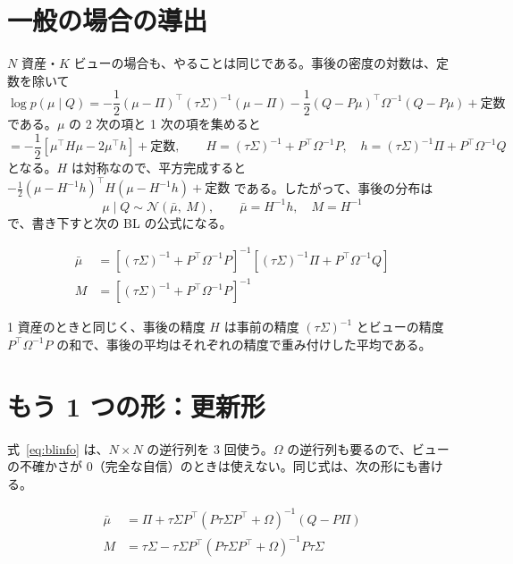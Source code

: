 \documentclass[xelatex,ja=standard,jafont=hiragino-pron,a4paper,11pt,openany]{bxjsreport}
\newcommand{\T}{^{\top}}
\newcommand{\mub}{\bar{\mu}}
\begin{document}
\section{一般の場合の導出}

$N$ 資産・$K$ ビューの場合も、やることは同じである。事後の密度の対数は、定数を除いて
\[
\log p(\mu \mid Q) = -\frac{1}{2}(\mu - \Pi)\T(\tau\Sigma)^{-1}(\mu - \Pi) - \frac{1}{2}(Q - P\mu)\T\Omega^{-1}(Q - P\mu) + \text{定数}
\]
である。$\mu$ の 2 次の項と 1 次の項を集めると
\[
= -\frac{1}{2}\left[\mu\T H\mu - 2\mu\T h\right] + \text{定数},\qquad
H = (\tau\Sigma)^{-1} + P\T\Omega^{-1}P,\quad
h = (\tau\Sigma)^{-1}\Pi + P\T\Omega^{-1}Q
\]
となる。$H$ は対称なので、平方完成すると $-\frac{1}{2}(\mu - H^{-1}h)\T H(\mu - H^{-1}h) + \text{定数}$ である。したがって、事後の分布は
\begin{equation}
\mu \mid Q \sim \mathcal{N}(\mub,\ M),\qquad
\mub = H^{-1}h,\quad M = H^{-1}
\end{equation}
で、書き下すと次の BL の公式になる。

\begin{thmbox}
\begin{align}
\mub &= \left[(\tau\Sigma)^{-1} + P\T\Omega^{-1}P\right]^{-1}\left[(\tau\Sigma)^{-1}\Pi + P\T\Omega^{-1}Q\right] \label{eq:blinfo}\\
M &= \left[(\tau\Sigma)^{-1} + P\T\Omega^{-1}P\right]^{-1} \label{eq:blM}
\end{align}
\end{thmbox}

1 資産のときと同じく、事後の精度 $H$ は事前の精度 $(\tau\Sigma)^{-1}$ とビューの精度 $P\T\Omega^{-1}P$ の和で、事後の平均はそれぞれの精度で重み付けした平均である。

\section{もう 1 つの形：更新形}\label{sec:update}

式~\eqref{eq:blinfo} は、$N \times N$ の逆行列を 3 回使う。$\Omega$ の逆行列も要るので、ビューの不確かさが 0（完全な自信）のときは使えない。同じ式は、次の形にも書ける。

\begin{thmbox}
\begin{align}
\mub &= \Pi + \tau\Sigma P\T\left(P\tau\Sigma P\T + \Omega\right)^{-1}\left(Q - P\Pi\right) \label{eq:blupdate}\\
M &= \tau\Sigma - \tau\Sigma P\T\left(P\tau\Sigma P\T + \Omega\right)^{-1}P\tau\Sigma \label{eq:blMupdate}
\end{align}
\end{thmbox}
\end{document}
